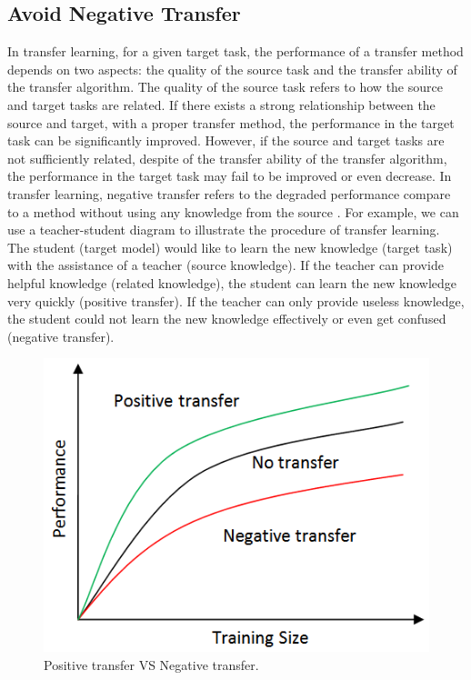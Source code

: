 \subsection{Avoid Negative Transfer}
In transfer learning, for a given target task, the performance of a transfer method depends on two aspects: the quality of the source task and the transfer ability of the transfer algorithm. The quality of the source task refers to how the source and target tasks are related. If there exists a strong relationship between the source and target, with a proper transfer method, the performance in the target task can be significantly improved. However, if the source and target tasks are not sufficiently related, despite of the transfer ability of the transfer algorithm, the performance in the target task may fail to be improved or even decrease. In transfer learning, negative transfer refers to the degraded performance compare to a method without using any knowledge from the source \cite{pan2010survey}. 
For example, we can use a teacher-student diagram to illustrate the procedure of transfer learning. The student (target model) would like to learn the new knowledge (target task) with the assistance of a teacher (source knowledge). If the teacher can provide helpful knowledge (related knowledge), the student can learn the new knowledge very quickly (positive transfer). If the teacher can only provide useless knowledge, the student could not learn the new knowledge effectively or even get confused (negative transfer).

\begin{figure}
\centering
\includegraphics[scale=.7]{relatedwork/fig/negative.png}
\caption{Positive transfer VS Negative transfer.}
\end{figure}

